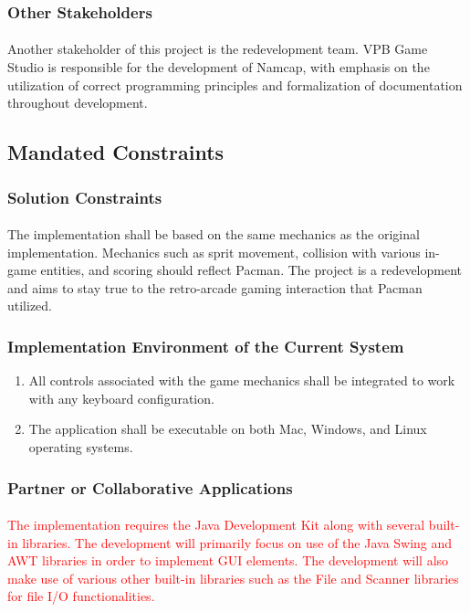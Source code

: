 \documentclass[12pt, titlepage]{article}
\begin{document}
\subsubsection{Other Stakeholders}
\paragraph{}
Another stakeholder of this project is the redevelopment team. VPB Game Studio is responsible for the development of Namcap, with emphasis on the utilization of correct programming principles and formalization of documentation throughout development.

\subsection{Mandated Constraints}

\subsubsection{Solution Constraints}
\paragraph{}
The implementation shall be based on the same mechanics as the original implementation. Mechanics such as sprit movement, collision with various in-game entities, and scoring should reflect Pacman. The project is a redevelopment and aims to stay true to the retro-arcade gaming interaction that Pacman utilized. 

\subsubsection{Implementation Environment of the Current System}
\begin{enumerate}[i]
\item All controls associated with the game mechanics shall be integrated to work with any keyboard configuration.
\item The application shall be executable on both Mac, Windows, and Linux operating systems.
\end{enumerate} 

\subsubsection{Partner or Collaborative Applications}
\paragraph{}
\textcolor{red}{The implementation requires the Java Development Kit along with several built-in libraries. The development will primarily focus on use of the Java Swing and AWT libraries in order to implement GUI elements. The development will also make use of various other built-in libraries such as the File and Scanner libraries for file I/O functionalities.}
\end{document}
